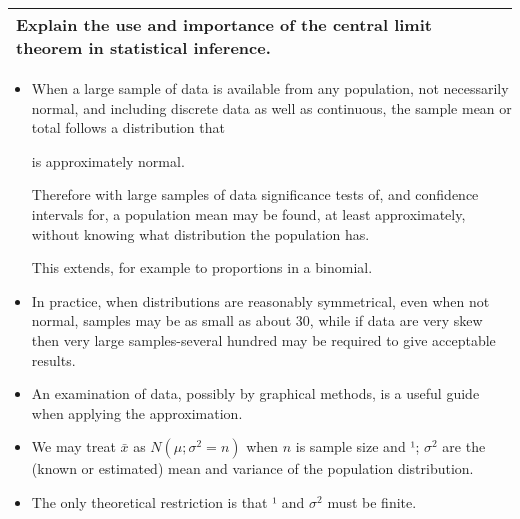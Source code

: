 \documentclass[a4paper,12pt]{article}
\begin{document}
\begin{table}[ht!]
 
\centering
 
\begin{tabular}{|p{15cm}|}
 
\hline  
\large
Explain the use and importance of the central limit theorem in statistical inference.

\\ \hline
  
\end{tabular}

\end{table}



\begin{itemize}
   
\item When a large sample of data is available from any population, not necessarily normal, and
including discrete data as well as continuous, the sample mean or total follows a distribution that

is approximately normal.

Therefore with large samples of data significance tests of, and confidence
intervals for, a population mean
may be found, at least approximately, without knowing what
distribution the population has.


This extends, for example to proportions in a binomial.



   
\item In practice, when distributions are reasonably symmetrical, even when not normal, samples
may be as small as about 30, while if data are very skew then very large
samples-several hundred may
be required to give acceptable results.


\item An examination of data, possibly by graphical methods,
is a useful guide when applying the approximation.


\item We may treat $\bar{x}$ as $N(\mu ; \sigma^2=n)$ when $n$ is sample size and ¹; $\sigma^2$ are the (known or estimated)
mean and variance of the population distribution.


\item The only theoretical restriction is that ¹ and $\sigma^2$ must be finite.

\end{itemize}
\end{document}
